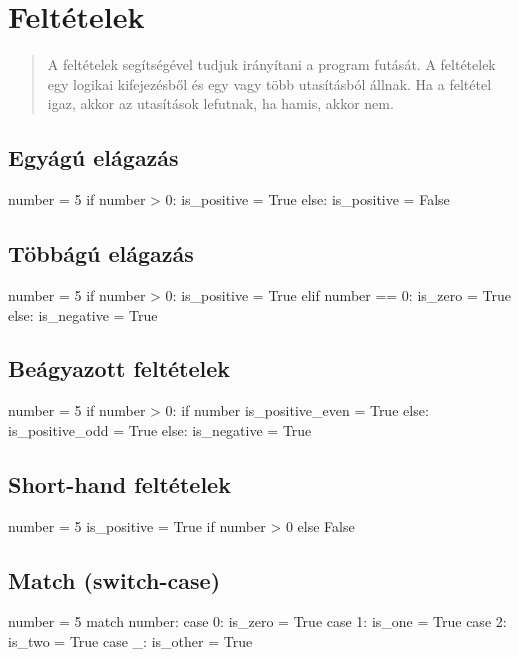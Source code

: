 \section{Feltételek}

\begin{quote}
    A feltételek segítségével tudjuk irányítani a program futását.
    A feltételek egy logikai kifejezésből és egy vagy több utasításból állnak.
    Ha a feltétel igaz, akkor az utasítások lefutnak, ha hamis, akkor nem.
\end{quote}

\subsection{Egyágú elágazás}
\begin{pycode}
    number = 5
    if number > 0:
        is_positive = True
    else:
        is_positive = False
\end{pycode}

\subsection{Többágú elágazás}
\begin{pycode}
    number = 5
    if number > 0:
        is_positive = True
    elif number == 0:
        is_zero = True
    else:
        is_negative = True
\end{pycode}

\newpage
\subsection{Beágyazott feltételek}
\begin{pycode}
    number = 5
    if number > 0:
        if number %
            is_positive_even = True
        else:
            is_positive_odd = True
    else:
        is_negative = True
\end{pycode}

\subsection{Short-hand feltételek}
\begin{pycode}
    number = 5
    is_positive = True if number > 0 else False
\end{pycode}

\subsection{Match (switch-case)}
\begin{pycode}
    number = 5
    match number:
        case 0:
            is_zero = True
        case 1:
            is_one = True
        case 2:
            is_two = True
        case _:
            is_other = True
\end{pycode}